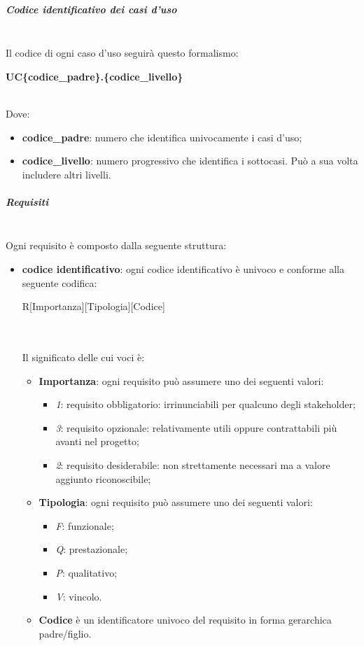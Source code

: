 \subparagraph{Codice identificativo dei casi d'uso} \mbox{}\\
Il codice di ogni caso d'uso seguirà questo formalismo: \\
\centerline{\textbf{UC\{codice\_padre\}.\{codice\_livello\}}} \\
Dove:
\begin{itemize}
	\item \textbf{codice\_padre}: numero che identifica univocamente i casi d'uso;
	\item \textbf{codice\_livello}: numero progressivo che identifica i sottocasi. Può a sua volta includere altri livelli.
\end{itemize}
\subparagraph{Requisiti} \mbox{}\\
Ogni requisito è composto dalla seguente struttura:
\begin{itemize}
	\item \textbf{codice identificativo}: ogni codice identificativo è univoco e conforme alla seguente codifica: \\
	\centerline{R[Importanza][Tipologia][Codice]} \\ \\
	Il significato delle cui voci è:
	\begin{itemize}
		\item \textbf{Importanza}: ogni requisito può assumere uno dei seguenti valori:
		\begin{itemize}
			\item \textit{1}: requisito obbligatorio: irrinunciabili per qualcuno degli stakeholder;
			\item \textit{3}: requisito opzionale: relativamente utili oppure contrattabili più avanti nel progetto;
			\item \textit{2}: requisito desiderabile: non strettamente necessari ma  a valore aggiunto riconoscibile;	
		\end{itemize}
		\item \textbf{Tipologia}: ogni requisito può assumere uno dei seguenti valori:
		\begin{itemize}
			\item \textit{F}: funzionale;
			\item \textit{Q}: prestazionale;
			\item \textit{P}: qualitativo;
			\item \textit{V}: vincolo.
		\end{itemize}
		\item \textbf{Codice} è un identificatore univoco del requisito in forma gerarchica padre/figlio.

\end{itemize}
\end{itemize}
